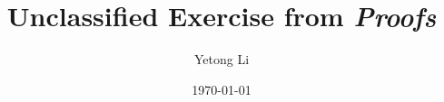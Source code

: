 \documentclass{article}
\begin{document}
\title{Unclassified Exercise from \it{Proofs}}
\author{Yetong Li}
\date{\today}
\maketitle
\end{document}
